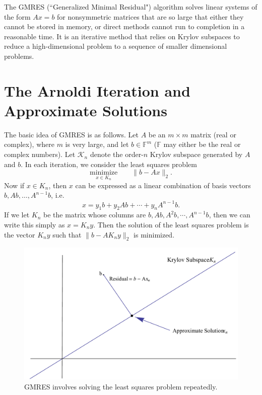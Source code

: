 \label{lab:GMRES}

The GMRES (``Generalized Minimal Residual") algorithm solves linear systems of the form $Ax=b$ for nonsymmetric matrices that are so 
large that either they cannot be stored in memory, or direct methods cannot run to completion in a reasonable time.
It is an iterative method that relies on Krylov subspaces to reduce a high-dimensional problem to a sequence of smaller dimensional 
problems.

\section*{The Arnoldi Iteration and Approximate Solutions}
The basic idea of GMRES is as follows. 
Let $A$ be an $m\times m$ matrix (real or complex), where $m$ is very large,
and let $b \in \mathbb{F}^m$ ($\mathbb{F}$ may either be the real or complex numbers).
Let $\mathcal{K}_n$ denote the order-$n$ Krylov subspace generated by $A$ and $b$.
In each iteration, we consider the least squares problem
\begin{equation*}
\underset{x \in K_n}{\text{minimize}}\qquad \|b-Ax\|_2.
\end{equation*}
Now if $x \in K_n$, then $x$ can be expressed as a linear combination of basis vectors $b, Ab, \ldots, A^{n-1}b$, i.e.
\[
x = y_1b + y_2Ab + \cdots + y_nA^{n-1}b.
\]
If we let $K_n$ be the matrix whose columns are $b, Ab, A^{2}b, \cdots, A^{n-1}b$, then we can write this simply as
$x = K_n y$.
Then the solution of the least squares problem is the vector $K_{n}y$ such that $\|b-A K_{n}y\|_2$ is minimized.
\begin{figure}
\includegraphics[width=\textwidth]{LeastSquares}
\caption{GMRES involves solving the least squares problem repeatedly.}
\end{figure}

